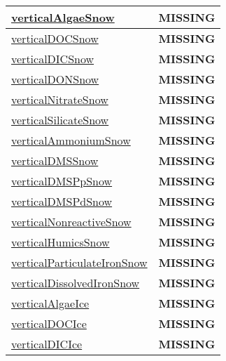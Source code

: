 {\begin{center}
\begin{longtable}{| p{2.0in} | p{4.0in} |}
    \hline
    \hyperref[subsec:var_sec_tracers_verticalAlgaeSnow]{verticalAlgaeSnow} & {\bf \color{red} MISSING} \\
    \hline
    \hyperref[subsec:var_sec_tracers_verticalDOCSnow]{verticalDOCSnow} & {\bf \color{red} MISSING} \\
    \hline
    \hyperref[subsec:var_sec_tracers_verticalDICSnow]{verticalDICSnow} & {\bf \color{red} MISSING} \\
    \hline
    \hyperref[subsec:var_sec_tracers_verticalDONSnow]{verticalDONSnow} & {\bf \color{red} MISSING} \\
    \hline
    \hyperref[subsec:var_sec_tracers_verticalNitrateSnow]{verticalNitrateSnow} & {\bf \color{red} MISSING} \\
    \hline
    \hyperref[subsec:var_sec_tracers_verticalSilicateSnow]{verticalSilicateSnow} & {\bf \color{red} MISSING} \\
    \hline
    \hyperref[subsec:var_sec_tracers_verticalAmmoniumSnow]{verticalAmmoniumSnow} & {\bf \color{red} MISSING} \\
    \hline
    \hyperref[subsec:var_sec_tracers_verticalDMSSnow]{verticalDMSSnow} & {\bf \color{red} MISSING} \\
    \hline
    \hyperref[subsec:var_sec_tracers_verticalDMSPpSnow]{verticalDMSPpSnow} & {\bf \color{red} MISSING} \\
    \hline
    \hyperref[subsec:var_sec_tracers_verticalDMSPdSnow]{verticalDMSPdSnow} & {\bf \color{red} MISSING} \\
    \hline
    \hyperref[subsec:var_sec_tracers_verticalNonreactiveSnow]{verticalNonreactiveSnow} & {\bf \color{red} MISSING} \\
    \hline
    \hyperref[subsec:var_sec_tracers_verticalHumicsSnow]{verticalHumicsSnow} & {\bf \color{red} MISSING} \\
    \hline
    \hyperref[subsec:var_sec_tracers_verticalParticulateIronSnow]{verticalParticulateIronSnow} & {\bf \color{red} MISSING} \\
    \hline
    \hyperref[subsec:var_sec_tracers_verticalDissolvedIronSnow]{verticalDissolvedIronSnow} & {\bf \color{red} MISSING} \\
    \hline
    \hyperref[subsec:var_sec_tracers_verticalAlgaeIce]{verticalAlgaeIce} & {\bf \color{red} MISSING} \\
    \hline
    \hyperref[subsec:var_sec_tracers_verticalDOCIce]{verticalDOCIce} & {\bf \color{red} MISSING} \\
    \hline
    \hyperref[subsec:var_sec_tracers_verticalDICIce]{verticalDICIce} & {\bf \color{red} MISSING} \\

\end{longtable}
\end{center}}
